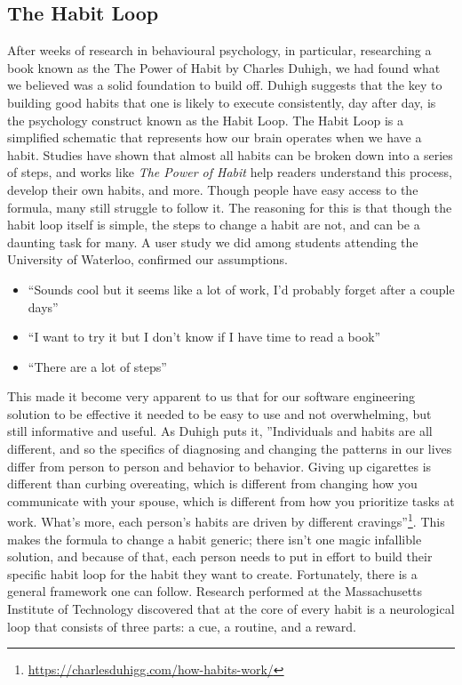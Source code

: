 \subsection{The Habit Loop}
After weeks of research in behavioural psychology, in particular, researching a book known as the The Power of Habit by Charles Duhigh, we had found what we believed was a solid foundation to build off. Duhigh suggests that the key to building good habits that one is likely to execute consistently, day after day, is the psychology construct known as the Habit Loop. The Habit Loop is a simplified schematic that represents how our brain operates when we have a habit. Studies have shown that almost all habits can be broken down into a series of steps, and works like \textit{The Power of Habit} help readers understand this process, develop their own habits, and more. Though people have easy access to the formula, many still struggle to follow it. The reasoning for this is that though the habit loop itself is simple, the steps to change a habit are not, and can be a daunting task for many. A user study we did among students attending the University of Waterloo, confirmed our assumptions.

\begin{itemize}
    \item “Sounds cool but it seems like a lot of work, I’d probably forget after a couple days”
    \item “I want to try it but I don’t know if I have time to read a book”
    \item “There are a lot of steps”
\end{itemize}

This made it become very apparent to us that for our software engineering solution to be effective it needed to be easy to use and not overwhelming, but still informative and useful. As Duhigh puts it, ”Individuals and habits are all different, and so the specifics of diagnosing and changing the patterns in our lives differ from person to person and behavior to behavior. Giving up cigarettes is different than curbing overeating, which is different from changing how you communicate with your spouse, which is different from how you prioritize tasks at work. What’s more, each person’s habits are driven by different cravings”\footnote{\url{https://charlesduhigg.com/how-habits-work/}}. This makes the formula to change a habit generic; there isn’t one magic infallible solution, and because of that, each person needs to put in effort to build their specific habit loop for the habit they want to create. Fortunately, there is a general framework one can follow. Research performed at the Massachusetts Institute of Technology discovered that at the core of every habit is a neurological loop that consists of three parts: a cue, a routine, and a reward.

